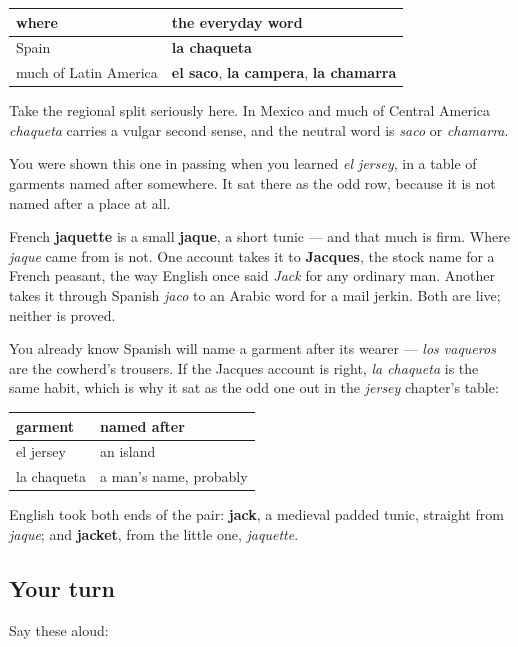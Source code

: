 \noindent
\begin{tabularx}{\linewidth}{@{}>{\raggedright\arraybackslash}X>{\raggedright\arraybackslash}X@{}}
\toprule
\textbf{where} & \textbf{the everyday word} \\
\midrule
Spain & \textbf{la chaqueta} \\
much of Latin America & \textbf{el saco}, \textbf{la campera}, \textbf{la chamarra} \\
\bottomrule
\end{tabularx}

Take the regional split seriously here. In Mexico and much of Central America \emph{chaqueta} carries a vulgar second sense, and the neutral word is \emph{saco} or \emph{chamarra}.

\begin{cousinweb}
You were shown this one in passing when you learned \emph{el jersey}, in a table of garments named after somewhere. It sat there as the odd row, because it is not named after a place at all.

French \textbf{jaquette} is a small \textbf{jaque}, a short tunic — and that much is firm. Where \emph{jaque} came from is not. One account takes it to \textbf{Jacques}, the stock name for a French peasant, the way English once said \emph{Jack} for any ordinary man. Another takes it through Spanish \emph{jaco} to an Arabic word for a mail jerkin. Both are live; neither is proved.

You already know Spanish will name a garment after its wearer — \emph{los vaqueros} are the cowherd's trousers. If the Jacques account is right, \emph{la chaqueta} is the same habit, which is why it sat as the odd one out in the \emph{jersey} chapter's table:

\noindent
\begin{tabularx}{\linewidth}{@{}>{\raggedright\arraybackslash}X>{\raggedright\arraybackslash}X@{}}
\toprule
\textbf{garment} & \textbf{named after} \\
\midrule
el jersey & an island \\
la chaqueta & a man's name, probably \\
\bottomrule
\end{tabularx}

English took both ends of the pair: \textbf{jack}, a medieval padded tunic, straight from \emph{jaque}; and \textbf{jacket}, from the little one, \emph{jaquette}.
\end{cousinweb}

\subsection*{Your turn}
Say these aloud:

